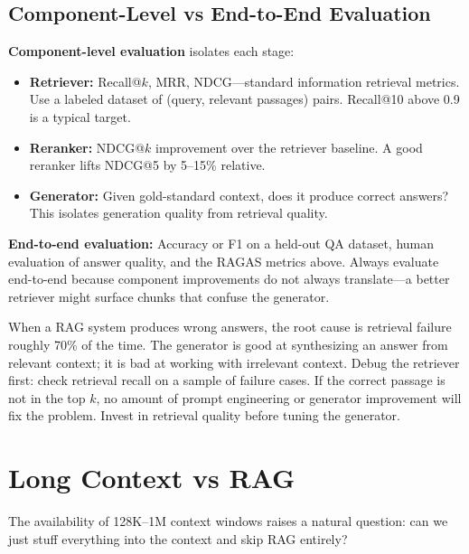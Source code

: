 \subsection{Component-Level vs End-to-End Evaluation}

\textbf{Component-level evaluation} isolates each stage:
\begin{itemize}
    \item \textbf{Retriever:} Recall@$k$, MRR, NDCG---standard information retrieval metrics. Use a labeled dataset of (query, relevant passages) pairs. Recall@10 above 0.9 is a typical target.
    \item \textbf{Reranker:} NDCG@$k$ improvement over the retriever baseline. A good reranker lifts NDCG@5 by 5--15\% relative.
    \item \textbf{Generator:} Given gold-standard context, does it produce correct answers? This isolates generation quality from retrieval quality.
\end{itemize}

\textbf{End-to-end evaluation:} Accuracy or F1 on a held-out QA dataset, human evaluation of answer quality, and the RAGAS metrics above. Always evaluate end-to-end because component improvements do not always translate---a better retriever might surface chunks that confuse the generator.

\begin{keyinsight}
When a RAG system produces wrong answers, the root cause is retrieval failure roughly 70\% of the time. The generator is good at synthesizing an answer from relevant context; it is bad at working with irrelevant context. Debug the retriever first: check retrieval recall on a sample of failure cases. If the correct passage is not in the top $k$, no amount of prompt engineering or generator improvement will fix the problem. Invest in retrieval quality before tuning the generator.
\end{keyinsight}

\section{Long Context vs RAG}
\label{sec:long_context_vs_rag}

The availability of 128K--1M context windows raises a natural question: can we just stuff everything into the context and skip RAG entirely?

